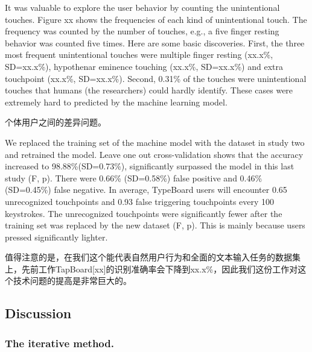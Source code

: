 
It was valuable to explore the user behavior by counting the unintentional touches. Figure xx shows the frequencies of each kind of unintentional touch. The frequency was counted by the number of touches, e.g., a five finger resting behavior was counted five times. Here are some basic discoveries. First, the three most frequent unintentional touches were multiple finger resting (xx.x\%, SD=xx.x\%), hypothenar eminence touching (xx.x\%, SD=xx.x\%) and extra touchpoint (xx.x\%, SD=xx.x\%). Second,
0.31\% of the touches were unintentional touches that humans (the researchers) could hardly identify. These cases were extremely hard to predicted by the machine learning model.

个体用户之间的差异问题。


We replaced the training set of the machine model with the dataset in study two and retrained the model. Leave one out cross-validation shows that the accuracy increased to 98.88\%(SD=0.73\%), significantly surpassed the model in this last study (F, p). There were 0.66\% (SD=0.58\%) false positive and 0.46\% (SD=0.45\%) false negative. In average, TypeBoard users will encounter 0.65 unrecognized touchpoints and 0.93 false triggering touchpoints every 100 keystrokes. The unrecognized touchpoints were significantly fewer after the training set was replaced by the new dataset (F, p). This is mainly because users pressed significantly lighter.

值得注意的是，在我们这个能代表自然用户行为和全面的文本输入任务的数据集上，先前工作TapBoard[xx]的识别准确率会下降到xx.x\%，因此我们这份工作对这个技术问题的提高是非常巨大的。


\subsection{Discussion}

\subsubsection{The iterative method.}

